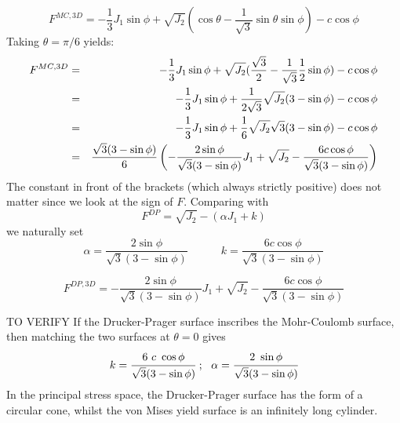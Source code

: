 \[
F^{MC,3D} = -\frac{1}{3}J_1 \sin \phi  + \sqrt{J_2} ( \cos \theta - \frac{1}{\sqrt{3}} \sin \theta  \sin \phi ) - c \cos \phi 
\]
Taking $\theta=\pi/6$ yields:
\begin{eqnarray}
F^{MC,3D} 
&=& -\frac{1}{3}J_1 \sin \phi  + \sqrt{J_2} ( \frac{\sqrt{3}}{2} - \frac{1}{\sqrt{3}} \frac{1}{2}  \sin \phi ) - c \cos \phi  \nonumber\\
&=& -\frac{1}{3}J_1 \sin \phi  + \frac{1}{2\sqrt{3}}\sqrt{J_2} ( 3 -  \sin \phi ) - c \cos \phi  \nonumber\\
&=& -\frac{1}{3}J_1 \sin \phi  + \frac{1}{6}\sqrt{J_2} \sqrt{3}( 3 -  \sin \phi ) - c \cos \phi  \nonumber\\
&=& \frac{\sqrt{3}(3-\sin\phi)}{6} \left( -  \frac{2 \sin \phi}{\sqrt{3}(3-\sin\phi)}   J_1  + \sqrt{J_2}  - \frac{6c \cos \phi}{\sqrt{3}(3-\sin\phi)} \right) \nonumber
\end{eqnarray}
The constant in front of the brackets (which always strictly positive) does not matter since we look at the sign of $F$.
Comparing with 
\[
F^{DP}=\sqrt{J_2} - (\alpha J_1 + k) \label{dpcriterion} 
\]
we naturally set 
\[
\alpha =\frac{2 \sin \phi}{\sqrt{3}(3-\sin\phi)}
\quad\quad\quad  
k =  \frac{6c \cos \phi}{\sqrt{3}(3-\sin\phi)} 
\]

\begin{mdframed}[backgroundcolor=blue!5]
\[
F^{DP,3D} =  -  \frac{2 \sin \phi}{\sqrt{3}(3-\sin\phi)}   J_1  + \sqrt{J_2}  - \frac{6c \cos \phi}{\sqrt{3}(3-\sin\phi)} 
\]
\end{mdframed}






\vspace{1.3cm}
TO VERIFY
If the Drucker-Prager surface inscribes the Mohr-Coulomb surface, then matching the two surfaces at $\theta=0$  gives
\[
k = \cfrac{6~c~\cos\phi}{\sqrt{3}(3-\sin\phi)} ~;~~ \alpha = \cfrac{2~\sin\phi}{\sqrt{3}(3-\sin\phi)} 
\]
In the principal stress space, the Drucker-Prager surface has the form of a circular cone, whilst the von Mises yield surface is an infinitely long cylinder.




